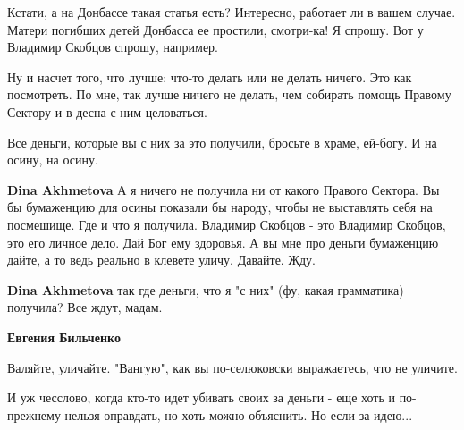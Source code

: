 \begin{itemize}
\begin{itemize}
Кстати, а на Донбассе такая статья есть? Интересно, работает ли в вашем случае.
Матери погибших детей Донбасса ее простили, смотри-ка! Я спрошу. Вот у Владимир
Скобцов спрошу, например.

Ну и насчет того, что лучше: что-то делать или не делать ничего. Это как
посмотреть. По мне, так лучше ничего не делать, чем собирать помощь Правому
Сектору и в десна с ним целоваться.

Все деньги, которые вы с них за это получили, бросьте в храме, ей-богу. И на
осину, на осину.

 
\textbf{Dina Akhmetova} А я ничего не получила ни от какого Правого Сектора. Вы
бы бумаженцию для осины показали бы народу, чтобы не выставлять себя на
посмешище. Где и что я получила. Владимир Скобцов - это Владимир Скобцов, это
его личное дело. Дай Бог ему здоровья. А вы мне про деньги бумаженцию дайте, а
то ведь реально в клевете уличу. Давайте. Жду.

 
\textbf{Dina Akhmetova} так где деньги, что я "с них" (фу, какая грамматика) получила? Все ждут, мадам.

 
\textbf{Евгения Бильченко} 

Валяйте, уличайте. "Вангую", как вы по-селюковски выражаетесь, что не уличите.

И уж чесслово, когда кто-то идет убивать своих за деньги - еще хоть и
по-прежнему нельзя оправдать, но хоть можно объяснить. Но если за идею...

 

\end{itemize}
\end{itemize}
